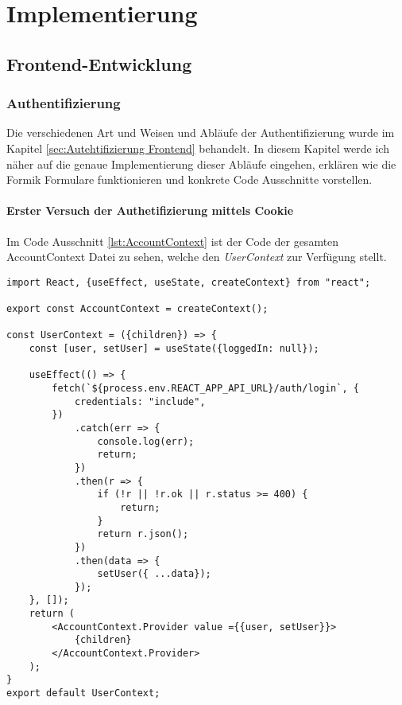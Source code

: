
\chapter{Implementierung}
    \section{Frontend-Entwicklung}
    \subsection{Authentifizierung}
    \label{sec:Auth-Impl-Front}
Die verschiedenen Art und Weisen und Abläufe der Authentifizierung wurde im Kapitel \ref{sec:Autehtifizierung Frontend} behandelt.
In diesem Kapitel werde ich näher auf die genaue Implementierung dieser Abläufe eingehen, erklären wie die Formik Formulare funktionieren und konkrete Code Ausschnitte vorstellen.
    \subsubsection{Erster Versuch der Authetifizierung mittels Cookie}
    \label{sec:Cookie-auth}
Im Code Ausschnitt \ref{lst:AccountContext} ist der Code der gesamten AccountContext Datei zu sehen, welche den \textit{UserContext} zur Verfügung stellt.

\begin{lstlisting}[style=codeStyle, caption={Die AccountContext.js-Datei}, label={lst:AccountContext}]
import React, {useEffect, useState, createContext} from "react";

export const AccountContext = createContext();

const UserContext = ({children}) => {
    const [user, setUser] = useState({loggedIn: null});

    useEffect(() => {
        fetch(`${process.env.REACT_APP_API_URL}/auth/login`, {
            credentials: "include",
        })
            .catch(err => {
                console.log(err);
                return;
            })
            .then(r => {
                if (!r || !r.ok || r.status >= 400) {
                    return;
                }
                return r.json();
            })
            .then(data => {
                setUser({ ...data});
            });
    }, []);
    return (
        <AccountContext.Provider value ={{user, setUser}}>
            {children}
        </AccountContext.Provider>
    );
}
export default UserContext;
\end{lstlisting}


